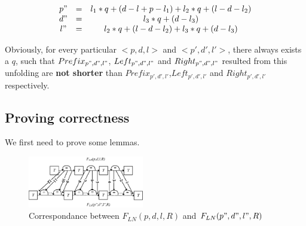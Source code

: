 \documentclass{acm_proc_article-sp}
\begin{document}
\begin{equation}
\begin{array}{ccc}
p"&=&l_1*q+(d-l+p-l_1)+l_2*q+(l-d-l_2) \\
d"&=&l_3*q+(d-l_3) \\
l"&=&l_2*q+(l-d-l_2)+l_3*q+(d-l_3)
\end{array}
\end{equation}

Obviously,
for every particular $<p,d,l>$ and $<p',d',l'>$,
there always exists a $q$,
such that $Prefix_{p",d",l"}$, $Left_{p",d",l"}$ and $Right_{p",d",l"}$ resulted from this unfolding
are \textbf{not shorter} than $Prefix_{p',d',l'}$,$Left_{p',d',l'}$ and $Right_{p',d',l'}$ respectively.



\subsection{Proving correctness}\label{subsec_correctness}

We first need to prove some lemmas.

\begin{figure}[b]
\centering
\includegraphics[width=0.45\textwidth]{doubleloop_unfold_cmp}
\caption{Correspondance between $F_{LN}(p,d,l,R)$ and $F_{LN}(p",d",l",R)$}
\label{doubleloop_unfold_cmp}
\end{figure}
\end{document}
